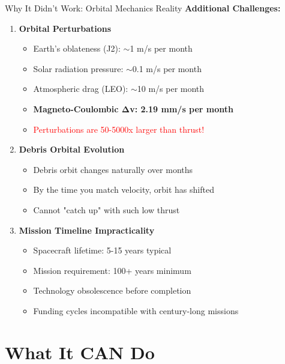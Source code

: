 \documentclass[aspectratio=169]{beamer}
\begin{document}
\begin{frame}{Why It Didn't Work: Orbital Mechanics Reality}
\textbf{Additional Challenges:}

\vspace{0.5em}
\begin{enumerate}
    \item \textbf{Orbital Perturbations}
    \begin{itemize}
        \item Earth's oblateness (J2): $\sim$1 m/s per month
        \item Solar radiation pressure: $\sim$0.1 m/s per month
        \item Atmospheric drag (LEO): $\sim$10 m/s per month
        \item \textbf{Magneto-Coulombic Δv: 2.19 mm/s per month}
        \item \textcolor{red}{Perturbations are 50-5000x larger than thrust!}
    \end{itemize}

    \item \textbf{Debris Orbital Evolution}
    \begin{itemize}
        \item Debris orbit changes naturally over months
        \item By the time you match velocity, orbit has shifted
        \item Cannot "catch up" with such low thrust
    \end{itemize}

    \item \textbf{Mission Timeline Impracticality}
    \begin{itemize}
        \item Spacecraft lifetime: 5-15 years typical
        \item Mission requirement: 100+ years minimum
        \item Technology obsolescence before completion
        \item Funding cycles incompatible with century-long missions
    \end{itemize}
\end{enumerate}
\end{frame}

\section{What It CAN Do}
\end{document}
